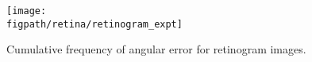 \begin{figure}
\centering
\texttt{[image: \\figpath/retina/retinogram\_expt]}
%
\caption{Cumulative frequency of angular error for retinogram images.}
\label{f:cumfreq}
\end{figure}